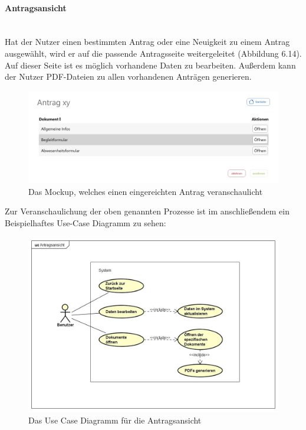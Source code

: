 \paragraph{Antragsansicht}
~\\
Hat der Nutzer einen bestimmten Antrag oder eine Neuigkeit zu einem Antrag ausgewählt, wird er auf die passende Antragsseite weitergeleitet (Abbildung 6.14). Auf dieser Seite ist es möglich vorhandene Daten zu bearbeiten. Außerdem kann der Nutzer PDF-Dateien zu allen vorhandenen Anträgen generieren.
\begin{figure}[H]
	\centering
	\includegraphics[width=1\linewidth]{images/Mockup-Antragsansicht}
	\caption[Mockup Antragsansicht]{Das Mockup, welches einen eingereichten Antrag veranschaulicht}
	\label{fig:mockupAntrag}
\end{figure}
Zur Veranschaulichung der oben genannten Prozesse ist im anschließendem ein Beispielhaftes Use-Case Diagramm zu sehen: 
\begin{figure}[H]
	\centering
	\includegraphics[width=1\linewidth]{images/uc-antrag}
	\caption[Use Case Diagramm Antragsansicht]{Das Use Case Diagramm für die Antragsansicht}
	\label{fig:ucAntrag}
\end{figure}